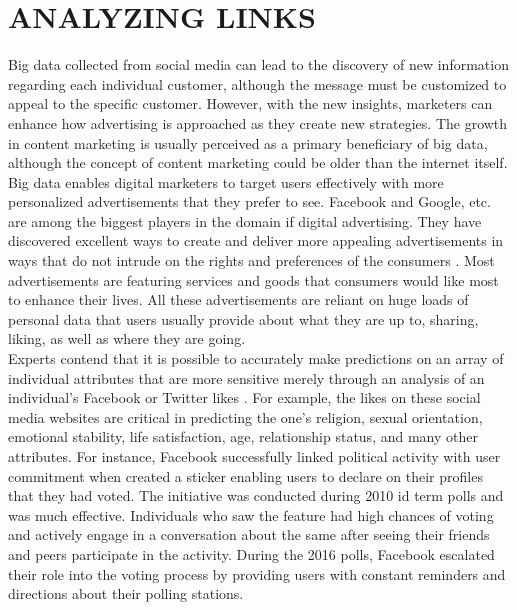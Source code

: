 \documentclass[sigconf]{acmart}
\begin{document}
\section{ANALYZING LINKS}

Big data collected from social media can lead to the discovery of new information regarding each individual customer, although the message must be customized to appeal to the specific customer. However, with the new insights, marketers can enhance how advertising is approached as they create new strategies. The growth in content marketing is usually perceived as a primary beneficiary of big data, although the concept of content marketing could be older than the internet itself. \\
Big data enables digital marketers to target users effectively with more personalized advertisements that they prefer to see. Facebook and Google, etc. are among the biggest players in the domain if digital advertising. They have discovered excellent ways to create and deliver more appealing advertisements in ways that do not intrude on the rights and preferences of the consumers \cite{Mangold&Faulds2009}. Most advertisements are featuring services and goods that consumers would like most to enhance their lives. All these advertisements are reliant on huge loads of personal data that users usually provide about what they are up to, sharing, liking, as well as where they are going.\\
Experts contend that it is possible to accurately make predictions on an array of individual attributes that are more sensitive merely through an analysis of an individual’s Facebook or Twitter likes \cite{Nate2014}. For example, the likes on these social media websites are critical in predicting the one’s religion, sexual orientation, emotional stability, life satisfaction, age, relationship status, and many other attributes. For instance, Facebook successfully linked political activity with user commitment when created a sticker enabling users to declare on their profiles that they had voted. The initiative was conducted during 2010 id term polls and was much effective. Individuals who saw the feature had high chances of voting and actively engage in a conversation about the same after seeing their friends and peers participate in the activity. During the 2016 polls, Facebook escalated their role into the voting process by providing users with constant reminders and directions about their polling stations.
\end{document}
